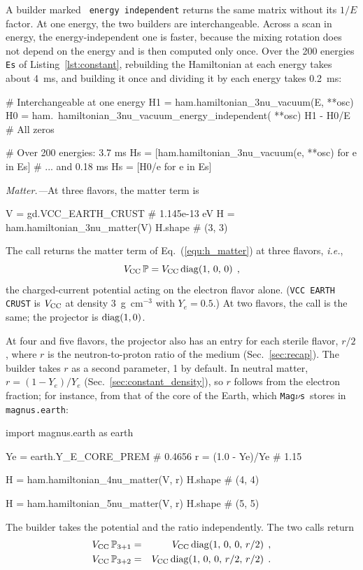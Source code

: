 \documentclass[final,5p,times,twocolumn,sort,compress]{elsarticle}
\makeatletter
\newcommand{\ie}{{\it i.e.}}
\newcommand{\eq}{Eq.}
\DeclareRobustCommand{\_}{%
  \ifmmode\nfss@text{\textunderscore}\else\textunderscore\allowbreak\fi}
\newcommand{\equ}[1]{\eq~(\ref{equ:#1})}
\newcommand{\magnus}{{\tt Mag}\ensuremath{\nu}{\tt s}}
\makeatother
\begin{document}
A builder marked {\tt \_energy\_independent} returns the same matrix without its $1/E$ factor. At one energy, the two builders are interchangeable. Across a scan in energy, the energy-independent one is faster, because the mixing rotation does not depend on the energy and is then computed only once. Over the 200 energies {\tt Es} of Listing~\ref{lst:constant}, rebuilding the Hamiltonian at each energy takes about 4~ms, and building it once and dividing it by each energy takes 0.2~ms:
\begin{pysnip}
# Interchangeable at one energy
H1 = ham.hamiltonian_3nu_vacuum(E, **osc)
H0 = ham.\
 hamiltonian_3nu_vacuum_energy_independent(
    **osc)
H1 - H0/E                     # All zeros

# Over 200 energies: 3.7 ms
Hs = [ham.hamiltonian_3nu_vacuum(e, **osc)
      for e in Es]
# ... and 0.18 ms
Hs = [H0/e for e in Es]
\end{pysnip}

\smallskip

\textit{Matter.---}At three flavors, the matter term is
\begin{pysnip}
V = gd.VCC_EARTH_CRUST         # 1.145e-13 eV
H = ham.hamiltonian_3nu_matter(V)
H.shape                        # (3, 3)
\end{pysnip}
The call returns the matter term of \equ{h_matter} at three flavors, \ie,
\begin{equation}
 \label{equ:h_matter_3nu}
 V_{\rm CC}\, \mathbb{P}
 =
 V_{\rm CC}\,
 {\rm diag}\!\left(1,\, 0,\, 0\right) \;,
\end{equation}
the charged-current potential acting on the electron flavor alone. ({\tt VCC\_EARTH\_CRUST} is $V_{\rm CC}$ at density 3~g~cm$^{-3}$ with $Y_e = 0.5$.) At two flavors, the call is the same; the projector is ${\rm diag}(1, 0)$.

At four and five flavors, the projector also has an entry for each sterile flavor, $r/2$, where $r$ is the neutron-to-proton ratio of the medium (Sec.~\ref{sec:recap}). The builder takes $r$ as a second parameter, 1 by default. In neutral matter, $r = (1 - Y_e)/Y_e$ (Sec.~\ref{sec:constant_density}), so $r$ follows from the electron fraction; for instance, from that of the core of the Earth, which \magnus\ stores in {\tt magnus.earth}:
\begin{pysnip}
import magnus.earth as earth

Ye = earth.Y_E_CORE_PREM       # 0.4656
r = (1.0 - Ye)/Ye              # 1.15

H = ham.hamiltonian_4nu_matter(V, r)
H.shape                        # (4, 4)

H = ham.hamiltonian_5nu_matter(V, r)
H.shape                        # (5, 5)
\end{pysnip}
The builder takes the potential and the ratio independently. The two calls return
\begin{eqnarray}
 \label{equ:h_matter_45nu}
 V_{\rm CC}\, \mathbb{P}_{3+1}
 &=&
 V_{\rm CC}\,
 {\rm diag}\!\left(1,\, 0,\, 0,\, r/2\right) \;,
 \nonumber \\
 V_{\rm CC}\, \mathbb{P}_{3+2}
 &=&
 V_{\rm CC}\,
 {\rm diag}\!\left(1,\, 0,\, 0,\, r/2,\, r/2\right) \;.
\end{eqnarray}
\end{document}
